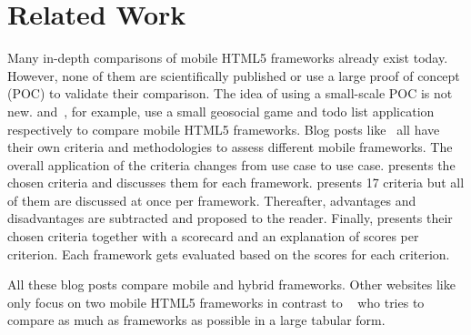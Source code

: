 \documentclass[a4paper]{artikel3}
\begin{document}


\section{Related Work} %
\label{sec:related-work}


Many in-depth comparisons of mobile HTML5 frameworks already exist today.  
However, none of them are scientifically published or use a large proof of concept (POC) to validate their comparison.  
The idea of using a small-scale POC is not new.  
\cite{Oeflman2011} and~\cite{Kosmaczewski2012},  for example,  use a small geosocial game and todo list application respectively to compare mobile HTML5 frameworks.
Blog posts like~\cite{Sarrafi2012a,Ayuso2012,Rozynski2011} all have their own criteria and methodologies to assess different mobile frameworks.  
The overall application of the criteria changes from use case to use case.  
\cite{Rozynski2011} presents the chosen criteria and discusses them for each framework.  
\cite{Ayuso2012} presents 17 criteria but all of them are discussed at once per framework.  
Thereafter,  advantages and disadvantages are subtracted and proposed to the reader.  
Finally, \cite{Sarrafi2012a} presents their chosen criteria together with a scorecard and an explanation of scores per criterion.  
Each framework gets evaluated based on the scores for each criterion.

All these blog posts compare mobile and hybrid frameworks.  
Other websites like~\cite{Bristowe2012,Burris} only focus on two mobile HTML5 frameworks in contrast to ~\cite{Falk2011} who tries to compare as much as frameworks as possible in a large tabular form.

\end{document}
